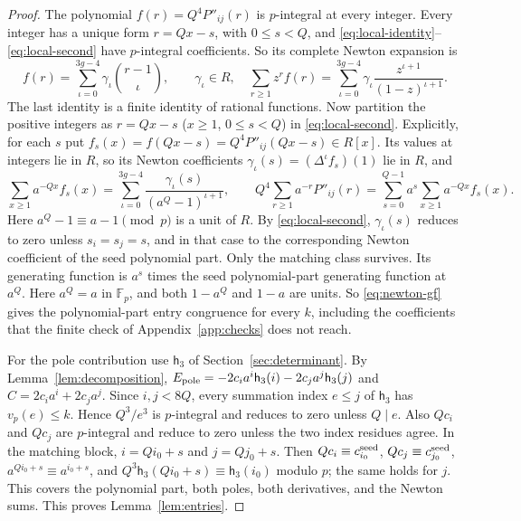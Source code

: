 \begin{proof}
The polynomial \(f(r)=Q^4P''_{ij}(r)\) is \(p\)-integral at every integer. Every integer has a unique form \(r=Qx-s\), with \(0\le s<Q\), and \eqref{eq:local-identity}--\eqref{eq:local-second} have \(p\)-integral coefficients. So its complete Newton expansion is
\begin{equation}\label{eq:newton-gf}
 f(r)=\sum_{\iota=0}^{3g-4}\gamma_\iota\binom{r-1}{\iota},\qquad \gamma_\iota\in R,
 \quad
 \sum_{r\ge1}z^rf(r)
 =\sum_{\iota=0}^{3g-4}\gamma_\iota\frac{z^{\iota+1}}{(1-z)^{\iota+1}}.
\end{equation}
The last identity is a finite identity of rational functions. Now partition the positive integers as \(r=Qx-s\) (\(x\ge1\), \(0\le{}s<Q\)) in \eqref{eq:local-second}. Explicitly, for each \(s\) put \(f_s(x)=f(Qx-s)=Q^4P''_{ij}(Qx-s)\in R[x]\). Its values at integers lie in \(R\), so its Newton coefficients \(\gamma_\iota(s)=(\Delta^\iota f_s)(1)\) lie in \(R\), and
\[
 \sum_{x\ge1}a^{-Qx}f_s(x)=\sum_{\iota=0}^{3g-4}\frac{\gamma_\iota(s)}{(a^Q-1)^{\iota+1}},
 \qquad
 Q^4\sum_{r\ge1}a^{-r}P''_{ij}(r)=\sum_{s=0}^{Q-1}a^s\sum_{x\ge1}a^{-Qx}f_s(x).
\]
Here \(a^Q-1\equiv a-1\pmod p\) is a unit of \(R\). By \eqref{eq:local-second}, \(\gamma_\iota(s)\) reduces to zero unless \(s_i=s_j=s\), and in that case to the corresponding Newton coefficient of the seed polynomial part. Only the matching class survives. Its generating function is \(a^s\) times the seed polynomial-part generating function at \(a^Q\). Here \(a^Q=a\) in \(\mathbb F_p\), and both \(1-a^Q\) and \(1-a\) are units. So \eqref{eq:newton-gf} gives the polynomial-part entry congruence for every \(k\), including the coefficients that the finite check of Appendix~\ref{app:checks} does not reach.

For the pole contribution use \(\mathsf h_3\) of Section~\ref{sec:determinant}. By Lemma~\ref{lem:decomposition}, \(E_{\rm pole}=-2c_i a^i \mathsf h_3(i)-2c_j a^j \mathsf h_3(j)\) and \(C=2c_i a^i+2c_j a^j\). Since \(i,j<8Q\), every summation index \(e\le j\) of \(\mathsf h_3\) has \(v_p(e)\le k\). Hence \(Q^3/e^3\) is \(p\)-integral and reduces to zero unless \(Q\mid e\). Also \(Qc_i\) and \(Qc_j\) are \(p\)-integral and reduce to zero unless the two index residues agree. In the matching block, \(i=Qi_0+s\) and \(j=Qj_0+s\). Then \(Qc_i\equiv c_{i_0}^{\rm seed}\), \(Qc_j\equiv c_{j_0}^{\rm seed}\), \(a^{Qi_0+s}\equiv a^{i_0+s}\), and \(Q^3\mathsf h_3(Qi_0+s)\equiv \mathsf h_3(i_0)\) modulo \(p\); the same holds for \(j\). This covers the polynomial part, both poles, both derivatives, and the Newton sums. This proves Lemma~\ref{lem:entries}.
\end{proof}

